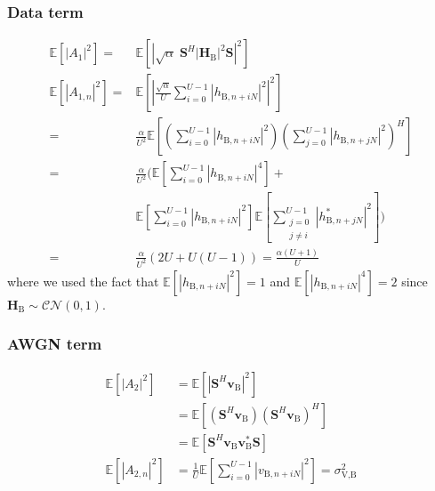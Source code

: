 \documentclass[journal,comsoc]{IEEEtran}
\newcommand{\module}[1]{\left|#1\right|}
\newcommand{\EX}[1]{\mathbb{E} \left[#1\right]}%
\newcommand{\HB}{\textbf{H}_{\text{B}}}
\newcommand{\vb}{\textbf{v}_{\text{B}}}
\newcommand{\spread}{\textbf{S}}
\begin{document}
\subsubsection{Data term}\label{sec:data-term-app}
\begin{equation}
	\begin{split}
		\EX{|A_1|^2} =& \EX{\module{\sqrt{\alpha} \; \spread^H \module{\HB}^2 \spread}^2} \\
		\EX{|A_{1,n}|^2} =&\EX{\left|\frac{\sqrt{\alpha}}{U}\sum_{i=0}^{U-1} \left| h_{\text{B}, n + iN}\right|^2\right|^2}  \\
		=& \frac{\alpha}{U^2} \EX{\left(\sum_{i=0}^{U-1} \left| h_{\text{B}, n + iN}\right|^2\right) \left(\sum_{j=0}^{U-1} \left| h_{\text{B}, n + jN}\right|^2\right)^H}\\
		=&  \frac{\alpha}{U^2} \Big(\EX{\sum_{i=0}^{U-1}\left| h_{\text{B}, n + iN}\right|^4} +\\
		& \EX{\sum_{i=0}^{U-1}\left| h_{\text{B}, n + iN}\right|^2}\EX{\sum_{\substack{j=0 \\ j\neq i}}^{U-1} | h^*_{\text{B}, n + jN}|^2} \Big) \\
		=& \frac{\alpha}{U^2} \left( 2U + U(U-1)\right) = \frac{\alpha (U+1)}{U}
	\end{split}
	\label{eq:appA:data_bob-app}
\end{equation}
where we used the fact that $\EX{\left| h_{\text{B}, n + iN}\right|^2} = 1$ and $\EX{\left| h_{\text{B}, n + iN}\right|^4} = 2$ since $\HB \sim \mathcal{CN}(0,1)$.



\subsubsection{AWGN term}\label{sec:awgn-term-app}
\begin{equation}
	\begin{split}
		\EX{|A_2|^2} &=  \EX{\module{\spread^H \vb}^2} \\
		&= \EX{\left(\spread^H \vb \right)\left(\spread^H \vb \right)^H} \\
		&=\EX{\spread^H \vb \vb^* \spread } \\
		\EX{|A_{2,n}|^2} &= \frac{1}{U} \EX{\sum_{i=0}^{U-1} |v_{\text{B}, n + iN}|^2} = \sigma^2_{\text{V,B}}
	\end{split}
	\label{eq:appA:noise_bob-app}
\end{equation}
\end{document}
